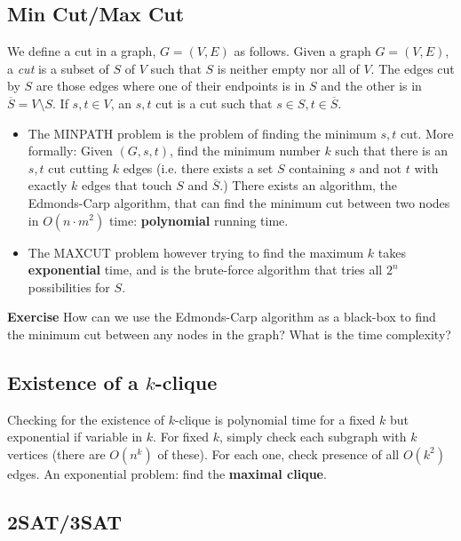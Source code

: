 \documentclass[11pt]{article}
\theoremstyle{definition}
\theoremstyle{remark}
\begin{document}
\subsection{Min Cut/Max Cut}
We define a cut in a graph, $G = (V, E)$ as follows. Given a graph $G=(V, E)$, a \textit{cut} is a subset of $S$ of $V$ such that $S$ is neither empty nor all of $V$. The edges cut by $S$ are those edges where one of their endpoints is in $S$ and the other is in $\overline{S}=V \setminus S.$ If $s, t \in V$, an $s, t$ cut is a cut such that $s \in S, t \in \overline{S}.$

\begin{itemize}
\item The \textsf{MINPATH} problem is the problem of finding the minimum $s, t$ cut. More formally: Given $(G, s, t)$, find the minimum number $k$ such that there is an $s, t$ cut cutting $k$ edges (i.e. there exists a set $S$ containing $s$ and not $t$ with exactly $k$ edges that touch $S$ and $\overline{S}.$) There exists an algorithm, the Edmonds-Carp algorithm, that can find the minimum cut between two nodes in $O(n\cdot m^2)$ time: \textbf{polynomial} running time. 

\item The \textsf{MAXCUT} problem however trying to find the maximum $k$ takes \textbf{exponential} time, and is the brute-force algorithm that tries all $2^n$ possibilities for $S$.

\end{itemize}


\noindent \textbf{Exercise} How can we use the Edmonds-Carp algorithm as a black-box to find the minimum cut between any nodes in the graph? What is the time complexity?\\


\subsection{Existence of a $k$-clique}

\noindent Checking for the existence of $k$-clique is polynomial time for a fixed 
$k$ but exponential if variable in $k$. For fixed $k$, simply check each subgraph
with $k$ vertices (there are $O(n^k)$ of these). For each one, check presence of 
all $O(k^2)$ edges. An exponential problem: find the \textbf{maximal clique}.

\subsection{2SAT/3SAT}
\end{document}
